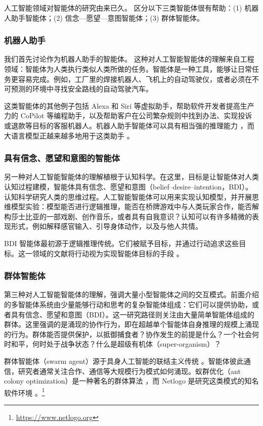 人工智能领域对智能体的研究由来已久。
区分以下三类智能体很有帮助：(1) 机器人助手智能体；(2) 信念—愿望—意图智能体；(3) 群体智能体。

\subsubsection{机器人助手}
我们首先讨论作为机器人助手的智能体。
这种对人工智能智能体的理解来自工程领域：智能体为人类执行类似人类所做的任务。智能体是一种工具，能够让日常任务更容易完成。例如，工厂里的焊接机器人、飞机上的自动驾驶仪，或者必须在不可预测的环境中寻找安全路线的自动驾驶汽车。

这类智能体的其他例子包括 Alexa 和 Siri 等虚拟助手，帮助软件开发者提高生产力的 CoPilot 等编程助手，以及帮助客户在公司繁杂规则中找到办法、实现投诉或退款等目标的客服机器人。机器人助手智能体可以具有相当强的推理能力 \citep{dorri2018multi}，而大语言模型正越来越多地用于这类助手 \citep{plaat2025agentic}。

\subsubsection{具有信念、愿望和意图的智能体}
另一种对人工智能智能体的理解植根于认知科学。在这里，目标是让智能体对人类认知过程建模，智能体具有信念、愿望和意图（belief–desire–intention，BDI）。认知科学研究人类的思维过程。人工智能智能体可以用来实现认知模型，并开展思维模型实验：模型能否进行逻辑推理，能否在桥牌游戏中与人类玩家合作，能否解构莎士比亚的一部戏剧、创作音乐，或者具有自我意识？认知可以有许多精微的表现形式，例如解释感官输入、引导身体动作，以及与他人共情。

BDI 智能体最初源于逻辑推理传统。它们被赋予目标，并通过行动追求这些目标。这一领域的文献将行动视为实现智能体目标的手段 \citep{rao1995bdi,georgeff1998belief}。

\subsubsection{群体智能体}
第三种对人工智能智能体的理解，强调大量小型智能体之间的交互模式。前面介绍的多智能体系统由少量能够行动和思考的复杂智能体组成：它们可以提供协助，或者具有信念、愿望和意图（BDI）。这一研究路径则关注由大量简单智能体组成的群体。这里强调的是涌现的协作行为，即在超越单个智能体自身推理的规模上涌现的行为。群体能否提供保护，以抵御捕食者？协作发生的前提是什么？一个社会何时和平，何时处于战争状态？什么是超级有机体（super-organism）\citep{johnson2010deconstructing,wilson1989reviving}？

群体智能体（swarm agent）源于具身人工智能的联结主义传统 \citep{brooks1990elephants}。智能体彼此通信，研究者通常关注合作、通信等大规模行为模式如何涌现。蚁群优化（ant colony optimization）是一种著名的群体算法 \citep{dorigo2007ant}，而 Netlogo 是研究这类模式的知名软件环境 \citep{wilensky2015introduction}。\footnote{\url{https://www.netlogo.org}}

